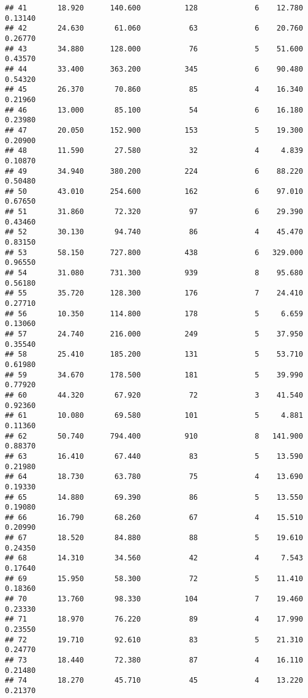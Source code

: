 \documentclass[]{article}
\begin{document}
\begin{verbatim}
## 41       18.920      140.600          128             6    12.780 0.13140
## 42       24.630       61.060           63             6    20.760 0.26770
## 43       34.880      128.000           76             5    51.600 0.43570
## 44       33.400      363.200          345             6    90.480 0.54320
## 45       26.370       70.860           85             4    16.340 0.21960
## 46       13.000       85.100           54             6    16.180 0.23980
## 47       20.050      152.900          153             5    19.300 0.20900
## 48       11.590       27.580           32             4     4.839 0.10870
## 49       34.940      380.200          224             6    88.220 0.50480
## 50       43.010      254.600          162             6    97.010 0.67650
## 51       31.860       72.320           97             6    29.390 0.43460
## 52       30.130       94.740           86             4    45.470 0.83150
## 53       58.150      727.800          438             6   329.000 0.96550
## 54       31.080      731.300          939             8    95.680 0.56180
## 55       35.720      128.300          176             7    24.410 0.27710
## 56       10.350      114.800          178             5     6.659 0.13060
## 57       24.740      216.000          249             5    37.950 0.35540
## 58       25.410      185.200          131             5    53.710 0.61980
## 59       34.670      178.500          181             5    39.990 0.77920
## 60       44.320       67.920           72             3    41.540 0.92360
## 61       10.080       69.580          101             5     4.881 0.11360
## 62       50.740      794.400          910             8   141.900 0.88370
## 63       16.410       67.440           83             5    13.590 0.21980
## 64       18.730       63.780           75             4    13.690 0.19330
## 65       14.880       69.390           86             5    13.550 0.19080
## 66       16.790       68.260           67             4    15.510 0.20990
## 67       18.520       84.880           88             5    19.610 0.24350
## 68       14.310       34.560           42             4     7.543 0.17640
## 69       15.950       58.300           72             5    11.410 0.18360
## 70       13.760       98.330          104             7    19.460 0.23330
## 71       18.970       76.220           89             4    17.990 0.23550
## 72       19.710       92.610           83             5    21.310 0.24770
## 73       18.440       72.380           87             4    16.110 0.21480
## 74       18.270       45.710           45             4    13.220 0.21370

\end{verbatim}
\end{document}
